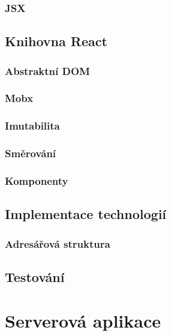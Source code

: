 \documentclass[a4paper,11pt,titlepage,fleqn]{article}
\begin{document}
        \subsubsection{JSX}


    \subsection{Knihovna React}
        
        \subsubsection{Abstraktní DOM}
        \subsubsection{Mobx}
        \subsubsection{Imutabilita}
        \subsubsection{Směrování}
        \subsubsection{Komponenty}


    \subsection{Implementace technologií}

        \subsubsection{Adresářová struktura}
        

    \subsection{Testování}


\newpage
\section{Serverová aplikace}
    
\end{document}
